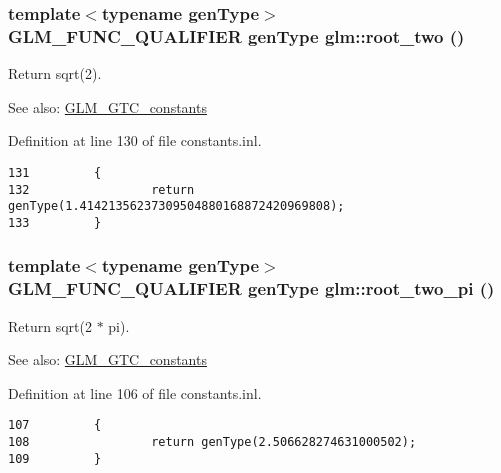 \hypertarget{group__gtc__constants_g7e985cdcc68d42d833072d09cac683dc}{
\subsubsection[root\_\-two]{\setlength{\rightskip}{0pt plus 5cm}template$<$typename genType$>$ GLM\_\-FUNC\_\-QUALIFIER genType glm::root\_\-two ()}}
\label{group__gtc__constants_g7e985cdcc68d42d833072d09cac683dc}


Return sqrt(2). \begin{Desc}
\item[See also:]\hyperlink{group__gtc__constants}{GLM\_\-GTC\_\-constants} \end{Desc}


Definition at line 130 of file constants.inl.

\begin{Code}\begin{verbatim}131         {
132                 return genType(1.41421356237309504880168872420969808);
133         }
\end{verbatim}
\end{Code}


\hypertarget{group__gtc__constants_g030fc8d3f9b605ce3d21dba058c930dd}{
\subsubsection[root\_\-two\_\-pi]{\setlength{\rightskip}{0pt plus 5cm}template$<$typename genType$>$ GLM\_\-FUNC\_\-QUALIFIER genType glm::root\_\-two\_\-pi ()}}
\label{group__gtc__constants_g030fc8d3f9b605ce3d21dba058c930dd}


Return sqrt(2 $\ast$ pi). \begin{Desc}
\item[See also:]\hyperlink{group__gtc__constants}{GLM\_\-GTC\_\-constants} \end{Desc}


Definition at line 106 of file constants.inl.

\begin{Code}\begin{verbatim}107         {
108                 return genType(2.506628274631000502);
109         }
\end{verbatim}
\end{Code}


